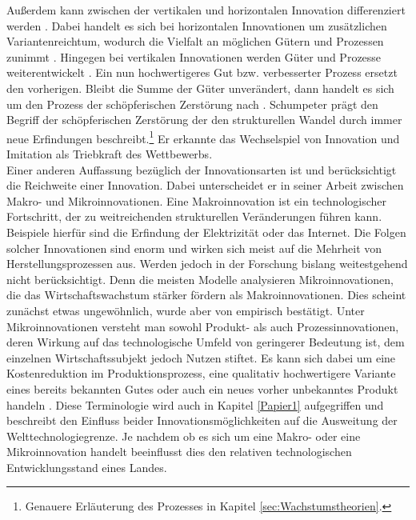 Au{\ss}erdem kann zwischen der vertikalen und horizontalen Innovation differenziert werden \citep{vanLong.1997}. Dabei handelt es sich bei horizontalen Innovationen um zus{\"a}tzlichen Variantenreichtum, wodurch die Vielfalt an m{\"o}glichen G{\"u}tern und Prozessen zunimmt \citep{Romer.1990}. Hingegen bei vertikalen Innovationen werden G{\"u}ter und Prozesse weiterentwickelt \citep{vanLong.1997}. Ein nun hochwertigeres Gut bzw. verbesserter Prozess ersetzt den vorherigen. Bleibt die Summe der G{\"u}ter unver{\"a}ndert, dann handelt es sich um den Prozess der schöpferischen Zerstörung nach \citep{Schumpeter.1934a}. Schumpeter pr{\"a}gt den Begriff der sch{\"o}pferischen Zerst{\"o}rung der den strukturellen Wandel durch immer neue Erfindungen beschreibt.\footnote{Genauere Erläuterung des Prozesses in Kapitel \ref{sec:Wachstumstheorien}.} Er erkannte das Wechselspiel von Innovation und Imitation als Triebkraft des Wettbewerbs.\\


Einer anderen Auffassung bezüglich der Innovationsarten ist \citet{Mokyr.1990} und berücksichtigt die Reichweite einer Innovation. Dabei unterscheidet er in seiner Arbeit zwischen Makro- und Mikroinnovationen. Eine Makroinnovation ist ein technologischer Fortschritt, der zu weitreichenden strukturellen Ver{\"a}nderungen f{\"u}hren kann. Beispiele hierf{\"u}r sind die Erfindung der Elektrizit{\"a}t oder das Internet. Die Folgen solcher Innovationen sind enorm und wirken sich meist auf die Mehrheit von Herstellungsprozessen aus. Werden jedoch in der Forschung bislang weitestgehend nicht ber{\"u}cksichtigt. \newline Denn die meisten Modelle analysieren Mikroinnovationen, die das Wirtschaftswachstum st{\"a}rker f{\"o}rdern als Makroinnovationen. Dies scheint zun{\"a}chst etwas ungewöhnlich, wurde aber von \citet{Abernathy.1978,Freeman.1982} empirisch best{\"a}tigt. Unter Mikroinnovationen versteht man sowohl Produkt- als auch Prozessinnovationen, deren Wirkung auf das technologische Umfeld von geringerer Bedeutung ist, dem einzelnen Wirtschaftssubjekt jedoch Nutzen stiftet. Es kann sich dabei um eine Kostenreduktion im Produktionsprozess, eine qualitativ hochwertigere Variante eines bereits bekannten Gutes oder auch ein neues vorher unbekanntes Produkt handeln \citep{Mokyr.1990}. Diese Terminologie wird auch in Kapitel \ref{Papier1} aufgegriffen und beschreibt den Einfluss beider Innovationsm{\"o}glichkeiten auf die Ausweitung der Welttechnologiegrenze. Je nachdem ob es sich um eine Makro- oder eine Mikroinnovation handelt beeinflusst dies den relativen technologischen Entwicklungsstand eines Landes.


